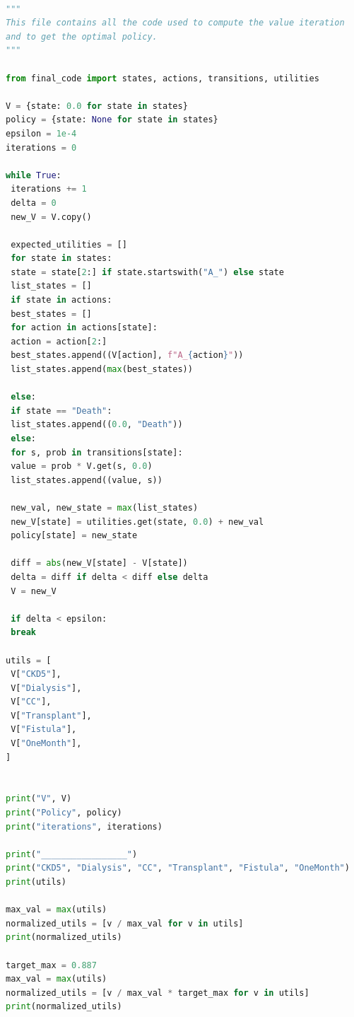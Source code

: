 \documentclass[10pt,twocolumn]{article}
\begin{document}
\begin{lstlisting}[language=Python]

"""
This file contains all the code used to compute the value iteration
and to get the optimal policy.
"""

from final_code import states, actions, transitions, utilities

V = {state: 0.0 for state in states}
policy = {state: None for state in states}
epsilon = 1e-4
iterations = 0

while True:
 iterations += 1
 delta = 0
 new_V = V.copy()

 expected_utilities = []
 for state in states:
 state = state[2:] if state.startswith("A_") else state
 list_states = []
 if state in actions:
 best_states = []
 for action in actions[state]:
 action = action[2:]
 best_states.append((V[action], f"A_{action}"))
 list_states.append(max(best_states))

 else:
 if state == "Death":
 list_states.append((0.0, "Death"))
 else:
 for s, prob in transitions[state]:
 value = prob * V.get(s, 0.0)
 list_states.append((value, s))

 new_val, new_state = max(list_states)
 new_V[state] = utilities.get(state, 0.0) + new_val
 policy[state] = new_state

 diff = abs(new_V[state] - V[state])
 delta = diff if delta < diff else delta
 V = new_V

 if delta < epsilon:
 break

utils = [
 V["CKD5"],
 V["Dialysis"],
 V["CC"],
 V["Transplant"],
 V["Fistula"],
 V["OneMonth"],
]


print("V", V)
print("Policy", policy)
print("iterations", iterations)

print("_________________")
print("CKD5", "Dialysis", "CC", "Transplant", "Fistula", "OneMonth")
print(utils)

max_val = max(utils)
normalized_utils = [v / max_val for v in utils]
print(normalized_utils)

target_max = 0.887
max_val = max(utils)
normalized_utils = [v / max_val * target_max for v in utils]
print(normalized_utils)

\end{lstlisting}
\end{document}
